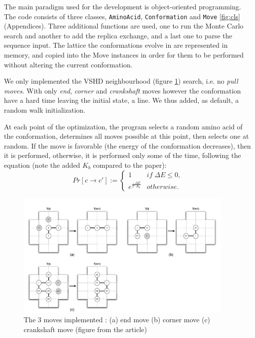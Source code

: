 \documentclass[a4paper, 12pt]{article}
\begin{document}
The main paradigm used for the development is object-oriented programming. The code consists of three classes, \texttt{AminoAcid}, \texttt{Conformation} and \texttt{Move} \ref{fig:cls} (Appendices). Three additional functions are used, one to run the Monte Carlo search and another to add the replica exchange, and a last one to parse the sequence input. The lattice the conformations evolve in are represented in memory, and copied into the Move instances in order for them to be performed without altering the current conformation.

We only implemented the VSHD neighbourhood (figure \ref{fig:moves}) search, i.e. no \emph{pull moves}. With only \emph{end}, \emph{corner} and \emph{crankshaft} moves however the conformation have a hard time leaving the initial state, a line. We thus added, as default, a random walk initialization.

At each point of the optimization, the program selects a random amino acid of the conformation, determines all moves possible at this point, then selects one at random. If the move is favorable (the energy of the conformation decreases), then it is performed, otherwise, it is performed only some of the time, following the equation (note the added \(K_b\) compared to the paper):
$$Pr[c\rightarrow {c}'] := \left\{\begin{matrix}
    1 & if \; \Delta E\leq 0,\\
    e^{\frac{-\Delta E}{T\cdot K_b}} & otherwise.
    \end{matrix}\right.$$


\begin{figure}[htbp]
\centering
\includegraphics[width=400px]{./vshd.png}
\caption{\label{fig:moves}The 3 moves implemented : (a) end move (b) corner move (c) crankshaft move (figure from the article)}
\end{figure}
\end{document}
